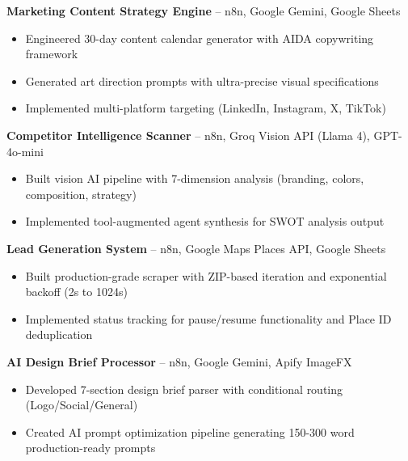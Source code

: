 \documentclass[11pt,a4paper]{article}
\begin{document}
\vspace{4pt}

\textbf{Marketing Content Strategy Engine} -- n8n, Google Gemini, Google Sheets
\begin{itemize}[leftmargin=0.5cm, itemsep=1pt, topsep=2pt, label={-}]
    \item Engineered 30-day content calendar generator with AIDA copywriting framework
    \item Generated art direction prompts with ultra-precise visual specifications
    \item Implemented multi-platform targeting (LinkedIn, Instagram, X, TikTok)
\end{itemize}

\vspace{4pt}

\textbf{Competitor Intelligence Scanner} -- n8n, Groq Vision API (Llama 4), GPT-4o-mini
\begin{itemize}[leftmargin=0.5cm, itemsep=1pt, topsep=2pt, label={-}]
    \item Built vision AI pipeline with 7-dimension analysis (branding, colors, composition, strategy)
    \item Implemented tool-augmented agent synthesis for SWOT analysis output
\end{itemize}

\vspace{4pt}

\textbf{Lead Generation System} -- n8n, Google Maps Places API, Google Sheets
\begin{itemize}[leftmargin=0.5cm, itemsep=1pt, topsep=2pt, label={-}]
    \item Built production-grade scraper with ZIP-based iteration and exponential backoff (2s to 1024s)
    \item Implemented status tracking for pause/resume functionality and Place ID deduplication
\end{itemize}

\vspace{4pt}

\textbf{AI Design Brief Processor} -- n8n, Google Gemini, Apify ImageFX
\begin{itemize}[leftmargin=0.5cm, itemsep=1pt, topsep=2pt, label={-}]
    \item Developed 7-section design brief parser with conditional routing (Logo/Social/General)
    \item Created AI prompt optimization pipeline generating 150-300 word production-ready prompts
\end{itemize}
\end{document}

